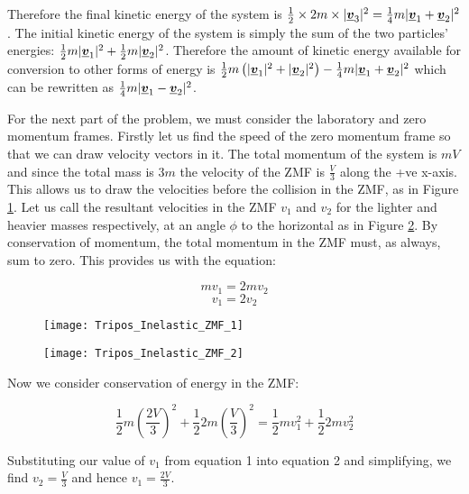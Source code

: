 \begin{problem}
{Therefore the final kinetic energy of the system is $\frac{1}{2}\times 2m \times |\mathit{\underline{\boldsymbol{v}}}_{3}|^2=\frac{1}{4}m|\mathit{\underline{\boldsymbol{v}}}_{1}+\mathit{\underline{\boldsymbol{v}}}_{2}|^2$. The initial kinetic energy of the system is simply the sum of the two particles' energies: $\frac{1}{2}m|\mathit{\underline{\boldsymbol{v}}}_{1}|^2+\frac{1}{2}m|\mathit{\underline{\boldsymbol{v}}}_{2}|^2$. Therefore the amount of kinetic energy available for conversion to other forms of energy is $\frac{1}{2}m\left(|\mathit{\underline{\boldsymbol{v}}}_{1}|^2+|\mathit{\underline{\boldsymbol{v}}}_{2}|^2\right)-\frac{1}{4}m|\mathit{\underline{\boldsymbol{v}}}_{1}+\mathit{\underline{\boldsymbol{v}}}_{2}|^2$ which can be rewritten as $\frac{1}{4}m|\mathit{\underline{\boldsymbol{v}}}_{1}-\mathit{\underline{\boldsymbol{v}}}_{2}|^2$.

For the next part of the problem, we must consider the laboratory and zero momentum frames. Firstly let us find the speed of the zero momentum frame so that we can draw velocity vectors in it. The total momentum of the system is $mV$ and since the total mass is $3m$ the velocity of the ZMF is $\frac{V}{3}$ along the +ve x-axis. This allows us to draw the velocities before the collision in the ZMF, as in Figure \ref{fig:Tripos_Inelastic_ZMF_1}. Let us call the resultant velocities in the ZMF $v_1$ and $v_2$ for the lighter and heavier masses respectively, at an angle $\phi$ to the horizontal as in Figure \ref{fig:Tripos_Inelastic_ZMF_2}. By conservation of momentum, the total momentum in the ZMF must, as always, sum to zero. This provides us with the equation:

\begin{equation*}mv_1=2mv_2\end{equation*}
\begin{equation}v_1=2v_2\end{equation}


\begin{figure}[h]
	\centering
	\texttt{[image: Tripos\_Inelastic\_ZMF\_1]}
	\caption{}
	\label{fig:Tripos_Inelastic_ZMF_1}
\end{figure}

\begin{figure}[h]
	\centering
	\texttt{[image: Tripos\_Inelastic\_ZMF\_2]}
	\caption{}
	\label{fig:Tripos_Inelastic_ZMF_2}
\end{figure}


Now we consider conservation of energy in the ZMF:

\begin{equation}\frac{1}{2}m\left(\frac{2V}{3}\right)^2+\frac{1}{2}2m\left(\frac{V}{3}\right)^2=\frac{1}{2}mv_1^2+\frac{1}{2}2mv_2^2\end{equation}

Substituting our value of $v_1$ from equation 1 into equation 2 and simplifying, we find $v_2=\frac{V}{3}$ and hence $v_1=\frac{2V}{3}$. 

}
\end{problem}
